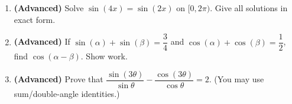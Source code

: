 \begin{enumerate}[leftmargin=*, label=\textbf{\arabic*.}, resume]
  \item \textbf{(Advanced)} Solve $\sin(4x) = \sin(2x)$ on $[0, 2\pi)$. Give all solutions in exact form. 
  \vgappp

  \item \textbf{(Advanced)} If $\sin(\alpha) + \sin(\beta) = \dfrac{3}{4}$ and $\cos(\alpha) + \cos(\beta) = \dfrac{1}{2}$, find $\cos(\alpha - \beta)$. Show work. 
  \vgappp

  \item \textbf{(Advanced)} Prove that $\dfrac{\sin(3\theta)}{\sin\theta} - \dfrac{\cos(3\theta)}{\cos\theta} = 2$. (You may use sum/double-angle identities.) 
  \vgappp

\end{enumerate}
